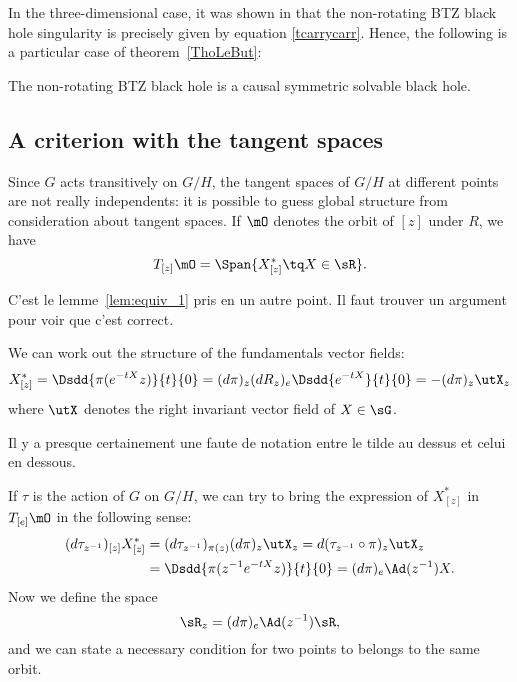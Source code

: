In the three-dimensional case, it was shown in \cite{BTZ_deux,BTZB_un} that the non-rotating BTZ black hole singularity is precisely given by equation \eqref{tcarrycarr}. Hence, the following is a particular case of theorem~\ref{ThoLeBut}:

\begin{corollary}
	The non-rotating BTZ black hole is a causal symmetric solvable black hole.
\end{corollary}

\subsection{A criterion with the tangent spaces}\label{subsec:R_z}

Since $G$ acts transitively on $G/H$, the tangent spaces of $G/H$ at different points are not really independents: it is possible to guess global structure from consideration about tangent spaces. If $\mO$ denotes the orbit of $[z]$ under $R$, we have
\[
	T_{[z]}\mO=\Span\{X^*_{[z]}\tq X\in\sR\}.
\]
\begin{probleme}
	C'est le lemme~\ref{lem:equiv_1} pris en un autre point. Il faut trouver un argument pour voir que c'est correct.
\end{probleme}

We can work out the structure of the fundamentals vector fields:
\begin{equation}
	X^*_{[z]}=\Dsdd{ \pi(e^{-tX}z) }{t}{0}
	=(d\pi)_z(dR_z)_e\Dsdd{e^{-tX}}{t}{0}
	=-(d\pi)_z\utX_z
\end{equation}
where $\utX$ denotes the right invariant vector field of $X\in\sG$.

\begin{probleme}
	Il y a presque certainement une faute de notation entre le tilde au dessus et celui en dessous.
\end{probleme}

If $\tau$ is the action of $G$ on $G/H$, we can try to bring the expression of $X^*_{[z]}$ in $T_{[e]}\mO$ in the following sense:
\begin{equation}
	\begin{split}
		(d\tau_{z^{-1}})_{[z]}X^*_{[z]} & =(d\tau_{z^{-1}})_{\pi(z)}(d\pi)_z\utX_z
		=d(\tau_{z^{-1}}\circ \pi)_z\utX_z                                         \\
		                                & =\Dsdd{ \pi( z^{-1} e^{-tX}z ) }{t}{0}
		=(d\pi)_e\Ad(z^{-1})X.
	\end{split}
\end{equation}
Now we define the space
\begin{equation}
	\sR_z=(d\pi)_e\Ad(z^{-1})\sR,
\end{equation}
and we can state a necessary condition for two points to belongs to the same orbit.

